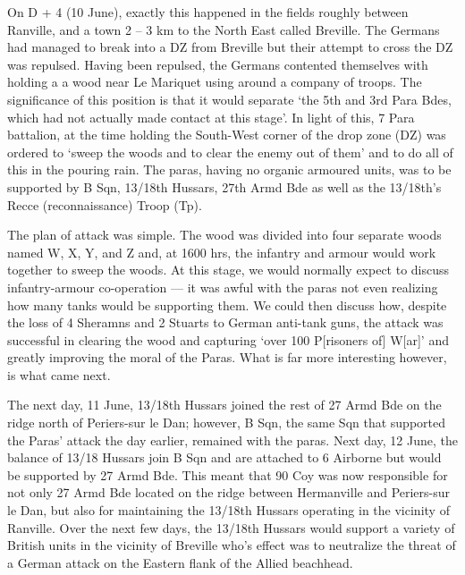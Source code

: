 \documentclass[noraggedright]{turabian-researchpaper}
\begin{document}
On D + 4 (10 June), exactly this happened in the fields roughly between 
Ranville, and a town 2 -- 3 km to the North East called Breville.  The
Germans had managed to break into a DZ from Breville but their attempt
to cross the DZ was repulsed.  Having been repulsed, the Germans contented
themselves with holding a a wood near Le Mariquet using around a company
of troops.  The significance of 
this position is that it would separate `the 5th and 3rd Para Bdes, which 
had not actually made contact at this stage'.\autocite[June, Appendix 2, p 1]
{7parawd}  In light of this, 7 Para battalion, at the time holding the 
South-West corner of the drop zone (DZ) was ordered to `sweep the woods and
to clear the enemy out of them' and to do all of this in the pouring 
rain.\autocite[June 1944, Appendix 2, p 1]{7parawd}  The paras, having no 
organic armoured units, was to be supported by B Sqn, 13/18th Hussars, 27th 
Armd Bde as well as the 13/18th's Recce (reconnaissance) Troop 
(Tp).\autocites[June 1944, Appendix 2, p 1]{7parawd}[10 June 1944]{1318wd}

The plan of attack was simple.  The wood was divided into four separate
woods named W, X, Y, and Z and, at 1600 hrs, the infantry and armour would 
work together to sweep the woods.  
At this stage, we would normally expect to discuss 
infantry-armour co-operation --- it was awful with the paras not even
realizing how many tanks would be supporting them.\autocite[June 1944, 
Appendix 2, p 2] {7parawd}
We could then discuss how, despite the loss of 4 Sheramns and 2 Stuarts to 
German anti-tank guns, the attack was successful in clearing the wood and 
capturing `over 100 P[risoners of] W[ar]' and greatly improving the moral
of the Paras.\autocite[10 June 1944]{1318wd}
What is far more interesting 
however, is what came next.  

The next day, 11 June, 13/18th Hussars joined the rest of 27 Armd Bde on the
ridge north of Periers-sur le Dan; however, B Sqn, the same Sqn that supported
the Paras' attack the day earlier, remained with the paras.  Next day, 12 June,
the balance of 13/18 Hussars join B Sqn and are attached to 6 Airborne but would
be supported by 27 Armd Bde.  This meant that 90 Coy was now responsible for
not only 27 Armd Bde located on the ridge between Hermanville and Periers-sur
le Dan, but also for maintaining the 13/18th Hussars operating in the vicinity
of Ranville.    Over the next few days, the 13/18th Hussars would support a 
variety of British units in the vicinity of Breville who's effect was to 
neutralize the threat of a German attack on the Eastern flank of the Allied
beachhead.
\end{document}
